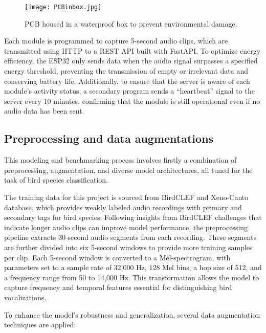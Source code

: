 \begin{figure}[h]
    \centering
    \texttt{[image: PCBinbox.jpg]}
    \caption{PCB housed in a waterproof box to prevent environmental damage.}
    \vspace{0.1cm}
    \label{fig:pcb_box}
\end{figure}


Each module is programmed to capture 5-second audio clips, which are transmitted using HTTP to a REST API built with FastAPI. To optimize energy efficiency, the ESP32 only sends data when the audio signal surpasses a specified energy threshold, preventing the transmission of empty or irrelevant data and conserving battery life. Additionally, to ensure that the server is aware of each module’s activity status, a secondary program sends a “heartbeat” signal to the server every 10 minutes, confirming that the module is still operational even if no audio data has been sent.

\subsection{Preprocessing and data augmentations}
This modeling and benchmarking process involves firstly a combination of preprocessing, augmentation, and diverse model architectures, all tuned for the task of bird species classification.

The training data for this project is sourced from BirdCLEF\cite{kahl2020overview} and Xeno-Canto\cite{conf/clef/VellingaP15} database, which provides weakly labeled audio recordings with primary and secondary tags for bird species. Following insights from BirdCLEF challenges that indicate longer audio clips can improve model performance, the preprocessing pipeline extracts 30-second audio segments from each recording. These segments are further divided into six 5-second windows to provide more training samples per clip. Each 5-second window is converted to a Mel-spectrogram, with parameters set to a sample rate of 32,000 Hz, 128 Mel bins, a hop size of 512, and a frequency range from 50 to 14,000 Hz. This transformation allows the model to capture frequency and temporal features essential for distinguishing bird vocalizations.

To enhance the model’s robustness and generalization, several data augmentation techniques are applied:

